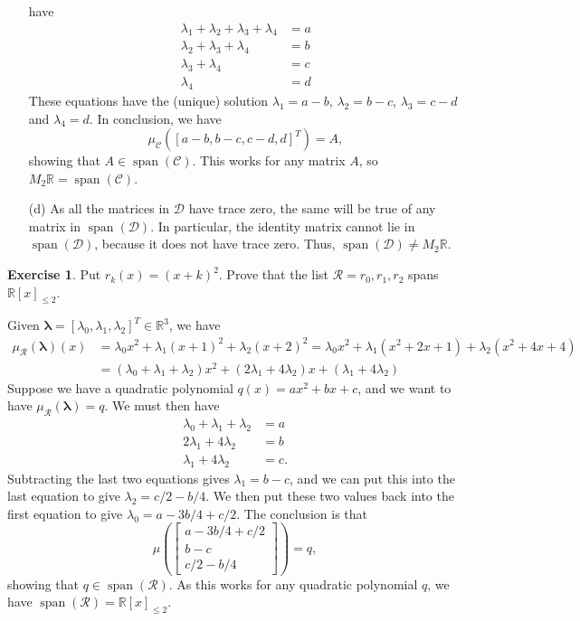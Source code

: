 \documentclass{amsart}
\newcommand{\R}         {{\mathbb{R}}}
\newcommand{\spn}       {\operatorname{span}}
\newcommand{\bsm}       {\left[\begin{smallmatrix}}
\newcommand{\esm}       {\end{smallmatrix}\right]}
\newcommand{\lm}        {\lambda}
\newcommand{\vlm}       {\mathbf{\lambda}}
\newcommand{\CC}        {{\mathcal{C}}}
\newcommand{\CD}        {{\mathcal{D}}}
\newcommand{\CR}        {{\mathcal{R}}}
\renewcommand{\:}       {\colon}
\theoremstyle{definition}
\newtheorem{exercise}{Exercise}[section]
\renewenvironment{solution}{\SolutionAtEnd}{\endSolutionAtEnd}
\begin{document}
\begin{solution}
\begin{itemize}
   have
   \begin{align*}
    \lm_1 + \lm_2 + \lm_3 + \lm_4 &= a \\
            \lm_2 + \lm_3 + \lm_4 &= b \\
                    \lm_3 + \lm_4 &= c \\
                            \lm_4 &= d
   \end{align*}
   These equations have the (unique) solution $\lm_1=a-b$,
   $\lm_2=b-c$, $\lm_3=c-d$ and $\lm_4=d$.  In conclusion,
   we have
   \[ \mu_{\CC}([a-b, b-c, c-d, d]^T) = A,  \]
   showing that $A\in\spn(\CC)$.  This works for any matrix
   $A$, so $M_2\R=\spn(\CC)$.
  \item[(d)] As all the matrices in $\CD$ have trace zero,
   the same will be true of any matrix in $\spn(\CD)$.  In
   particular, the identity matrix cannot lie in
   $\spn(\CD)$, because it does not have trace zero.  Thus,
   $\spn(\CD)\neq M_2\R$.
 \end{itemize}
\end{solution}

\begin{exercise}
 Put $r_k(x)=(x+k)^2$.  Prove that the list
 $\CR=r_0,r_1,r_2$ spans $\R[x]_{\leq 2}$.
\end{exercise}
\begin{solution}
 Given $\vlm=[\lm_0,\lm_1,\lm_2]^T\in\R^3$, we have 
 \begin{align*}
  \mu_\CR(\vlm)(x)
   &= \lm_0x^2 + \lm_1(x+1)^2 + \lm_2(x+2)^2 
    = \lm_0x^2 + \lm_1(x^2+2x+1) + \lm_2(x^2+4x+4) \\
   &= (\lm_0+\lm_1+\lm_2)x^2 + (2\lm_1+4\lm_2)x + (\lm_1+4\lm_2)
 \end{align*}
 Suppose we have a quadratic polynomial $q(x)=ax^2+bx+c$,
 and we want to have $\mu_\CR(\vlm)=q$.  We must then have
 \begin{align*}
  \lm_0+\lm_1+\lm_2 &= a \\
  2\lm_1 + 4\lm_2 &= b \\
  \lm_1 + 4\lm_2 &= c.
 \end{align*}
 Subtracting the last two equations gives $\lm_1=b-c$, and
 we can put this into the last equation to give
 $\lm_2=c/2-b/4$.  We then put these two values back into
 the first equation to give $\lm_0=a-3b/4+c/2$.  The
 conclusion is that
 \[ \mu\left(\bsm a-3b/4+c/2 \\ b-c \\ c/2-b/4\esm\right) = q,
 \]
 showing that $q\in\spn(\CR)$.  As this works for any
 quadratic polynomial $q$, we have $\spn(\CR)=\R[x]_{\leq 2}$.
\end{solution}
\end{document}
